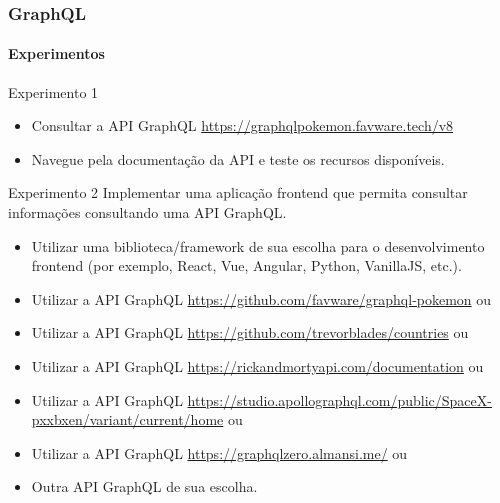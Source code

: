 \documentclass[
	9pt, %
	t, %
]{beamer}
\begin{document}
\begin{frame}
	\frametitle{GraphQL}
	\framesubtitle{Experimentos}
	{\small
		\begin{block}{Experimento 1}
			\begin{itemize}
				\item Consultar a API GraphQL
				      \href{https://graphqlpokemon.favware.tech/v8}{https://graphqlpokemon.favware.tech/v8}
				\item Navegue pela documentação da API e teste os recursos disponíveis.
			\end{itemize}
		\end{block}

		\begin{block}{Experimento 2}
			Implementar uma aplicação frontend que permita consultar informações consultando uma API GraphQL.
			\begin{itemize}
				\item Utilizar uma biblioteca/framework de sua escolha para o desenvolvimento
				      frontend (por exemplo, React, Vue, Angular, Python, VanillaJS, etc.).
				\item Utilizar a API GraphQL
				      \href{https://github.com/favware/graphql-pokemon}{https://github.com/favware/graphql-pokemon}
				      ou
				\item Utilizar a API GraphQL
				      \href{https://github.com/trevorblades/countries/}{https://github.com/trevorblades/countries}
				      ou
				\item Utilizar a API GraphQL
				      \href{https://rickandmortyapi.com/documentation}{https://rickandmortyapi.com/documentation}
				      ou
				\item Utilizar a API GraphQL
				      \href{https://studio.apollographql.com/public/SpaceX-pxxbxen/variant/current/home}{https://studio.apollographql.com/public/SpaceX-pxxbxen/variant/current/home}
				      ou
				\item Utilizar a API GraphQL
				      \href{https://graphqlzero.almansi.me/}{https://graphqlzero.almansi.me/} ou
				\item Outra API GraphQL de sua escolha.

			\end{itemize}
		\end{block}
	}

\end{frame}
\end{document}
